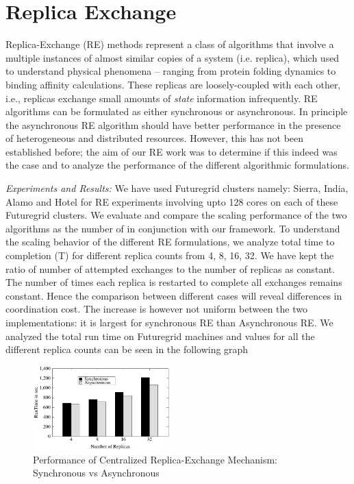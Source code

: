 \documentclass[]{paper}
\begin{document}
\section{Replica Exchange}

Replica-Exchange (RE) methods represent a class of algorithms that involve a multiple instances of almost similar copies of a system (i.e. replica), which used to understand physical phenomena – ranging from protein folding dynamics to binding affinity calculations. These replicas are loosely-coupled with each other, i.e., replicas exchange small amounts of {\it state} information infrequently.  RE algorithms can be formulated as either synchronous or asynchronous.  In principle the asynchronous RE algorithm should have better performance in the presence of heterogeneous and distributed resources.  However, this has not been established before; the aim of our RE work was to determine if this indeed was the case and to analyze the performance of the different algorithmic formulations.


{\it Experiments and Results:} We have used Futuregrid clusters namely: Sierra, India, Alamo and Hotel for RE experiments involving upto 128 cores on each of these Futuregrid clusters. We evaluate and compare the scaling
performance of the two algorithms as the number of in conjunction with our framework. To understand the scaling behavior of the different RE formulations, we analyze total time to completion (T) for different replica counts from 4, 8, 16, 32. We have kept the ratio of number of attempted exchanges to the number of replicas as constant. The number of times each replica is restarted to complete all exchanges remains constant. Hence the comparison between different cases will reveal differences in coordination cost. The increase is however not uniform between the two implementations: it is largest for synchronous RE than Asynchronous RE. We analyzed the total run time on Futuregrid machines and values for all the different replica counts can be seen in the following graph \begin{figure}[t]
  \centering \includegraphics[width=0.47\textwidth]{figures/FG_RE.pdf} \caption{Performance of Centralized Replica-Exchange Mechanism: Synchronous vs Asynchronous}
\label{figure(i)}
\end{figure}		
\end{document}
